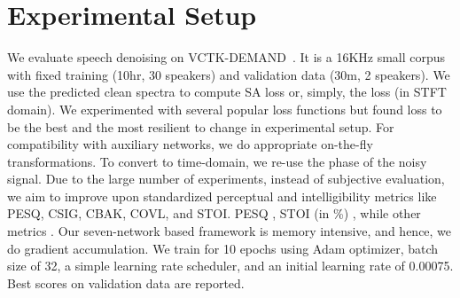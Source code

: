 \documentclass{article}
\begin{document}
\section{Experimental Setup}
\label{sec:exp}
We evaluate speech denoising on VCTK-DEMAND~\cite{valentini2016investigating}.
It is a 16KHz small corpus with fixed training (10hr, 30 speakers) and validation data (30m, 2 speakers).
We use the predicted clean spectra to compute \ac{SA} loss or, simply, the  loss (in STFT domain).
We experimented with several popular loss functions but found  loss to be the best and the most resilient to change in experimental setup.
For compatibility with auxiliary networks, we do appropriate on-the-fly transformations.
To convert to time-domain, we re-use the phase of the noisy signal.
Due to the large number of experiments, instead of subjective evaluation, we aim to improve upon standardized perceptual and intelligibility metrics like PESQ, CSIG, CBAK, COVL, and STOI.
PESQ , STOI (in \%) , while other metrics .
Our seven-network based framework is memory intensive, and hence, we do gradient accumulation.
We train for 10 epochs using Adam optimizer, batch size of 32, a simple learning rate scheduler, and an initial learning rate of 0.00075.
Best scores on validation data are reported.

\begin{table}[t]
\centering
\caption{Comparison of perceptual losses of various speech models with simple  loss.  refers to \#parameters of auxiliary network.}
\label{tab:base}
\end{table}
\end{document}
